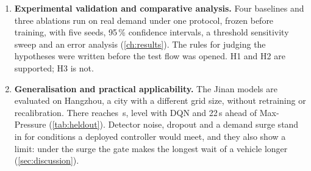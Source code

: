 \begin{enumerate}
Over six test conditions the largest regret of \ugmarl{} is \,s,
the smallest of all controllers (\cref{tab:robust}). Each decision is logged with $\sigma$,
the gate outcome and the attention weights. CoLight \citep{wei2019colight} presents its
attention weights as an explanation. Here the weights were tested before being read that way:
they rank neighbour influence correctly, but a neighbour carries only about a seventh of the influence
of the intersection's own observation (\cref{sec:discussion}). One joint decision takes
0.81\,ms.
\item \textbf{Experimental validation and comparative analysis.} Four baselines and three
ablations run on real demand under one protocol, frozen before training, with five seeds,
95\,\% confidence intervals, a threshold sensitivity sweep and an error analysis
(\cref{ch:results}). The rules for judging the hypotheses were written before the test flow
was opened. H1 and H2 are supported; H3 is not.
\item \textbf{Generalisation and practical applicability.} The Jinan models are evaluated on
Hangzhou, a city with a different grid size, without retraining or recalibration. There
\ugmarl{} reaches \,s, level with DQN and 22\,s ahead of Max-Pressure
(\cref{tab:heldout}). Detector noise, dropout and a demand surge stand in for conditions a
deployed controller would meet, and they also show a limit: under the surge the gate makes
the longest wait of a vehicle longer (\cref{sec:discussion}).
\end{enumerate}
